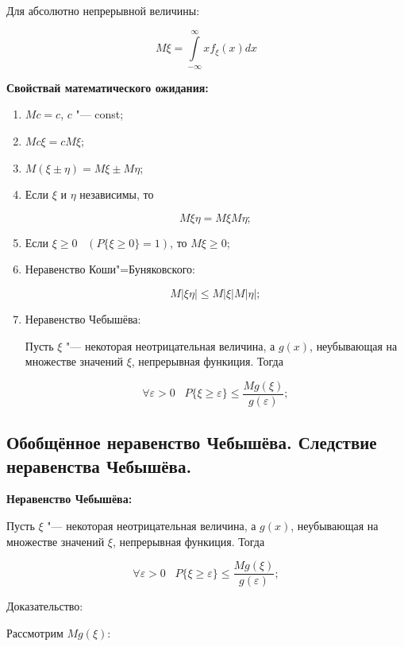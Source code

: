     Для абсолютно непрерывной величины:

    \[
        M\xi = \int\limits^{\infty}_{-\infty} x f_{\xi} (x) dx  
    \]

\textbf{Свойствай математического ожидания:}
    \smallskip    

    \begin{enumerate}
        \item{$Mc = c$, $c$ "--- const;}
        \item{$Mc\xi = cM\xi$;}
        \item{$M(\xi \pm \eta) = M\xi \pm M\eta$;}
        \item{Если $\xi$ и $\eta$ независимы, то 
        
        \[
            M\xi\eta = M\xi M\eta;   
        \]
        }
        \item{Если $\xi \geq 0 \;\;\; (P\{\xi \geq 0\} = 1)$, то
        $M\xi \geq 0$;}
        \item{Неравенство Коши"=Буняковского:
        
        \[
            M|\xi\eta| \leq M|\xi|M|\eta|;  
        \]
        }
        \item{Неравенство Чебышёва:
        
        Пусть $\xi$ "--- некоторая неотрицательная величина,
        а $g(x)$, неубывающая на множестве значений $\xi$, 
        непрерывная функиция. Тогда
        
        \[
            \forall \varepsilon > 0 \;\;\; P\{\xi \geq \varepsilon\} \leq
            \frac{Mg(\xi)}{g(\varepsilon)};
        \]
        }
    \end{enumerate}

\subsection{Обобщённое неравенство Чебышёва. Следствие неравенства Чебышёва.}
    
\textbf{Неравенство Чебышёва:}
    \smallskip
            
    Пусть $\xi$ "--- некоторая неотрицательная величина,
    а $g(x)$, неубывающая на множестве значений $\xi$, 
    непрерывная функиция. Тогда
    
    \[
        \forall \varepsilon > 0 \;\;\; P\{\xi \geq \varepsilon\} \leq
        \frac{Mg(\xi)}{g(\varepsilon)};
    \]
    \bigskip

    Доказательство:
    \bigskip
    
    Рассмотрим $Mg(\xi)$:

